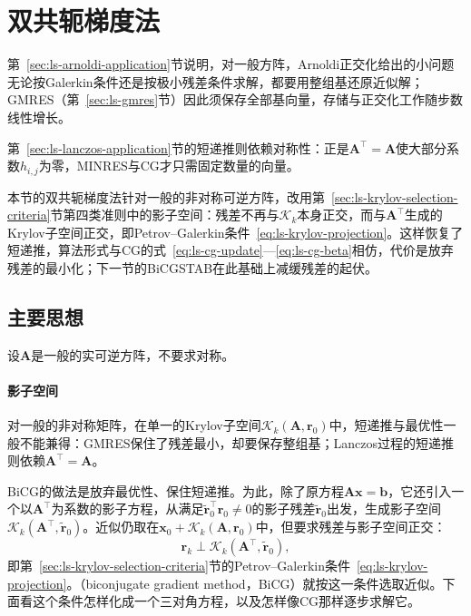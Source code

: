 \section{双共轭梯度法}
\label{sec:ls-bicg}

第~\ref{sec:ls-arnoldi-application}节说明，对一般方阵，Arnoldi正交化给出的小问题无论按Galerkin条件还是按极小残差条件求解，都要用整组基还原近似解；GMRES（第~\ref{sec:ls-gmres}节）因此须保存全部基向量，存储与正交化工作随步数线性增长。

第~\ref{sec:ls-lanczos-application}节的短递推则依赖对称性：正是$\bm A^\top=\bm A$使大部分系数$h_{i,j}$为零，MINRES与CG才只需固定数量的向量。

本节的双共轭梯度法针对一般的非对称可逆方阵，改用第~\ref{sec:ls-krylov-selection-criteria}节第四类准则中的影子空间：残差不再与$\mathcal K_k$本身正交，而与$\bm A^\top$生成的Krylov子空间正交，即Petrov--Galerkin条件~\eqref{eq:ls-krylov-projection}。这样恢复了短递推，算法形式与CG的式~\eqref{eq:ls-cg-update}—\eqref{eq:ls-cg-beta}相仿，代价是放弃残差的最小化；下一节的BiCGSTAB在此基础上减缓残差的起伏。

\subsection{主要思想}

设$\bm A$是一般的实可逆方阵，不要求对称。

\paragraph{影子空间}
对一般的非对称矩阵，在单一的Krylov子空间$\mathcal K_k(\bm A,\bm r_0)$中，短递推与最优性一般不能兼得：GMRES保住了残差最小，却要保存整组基；Lanczos过程的短递推则依赖$\bm A^\top=\bm A$。

BiCG的做法是放弃最优性、保住短递推。为此，除了原方程$\bm A\bm x=\bm b$，它还引入一个以$\bm A^\top$为系数的影子方程，从满足$\widetilde{\bm r}_0^\top\bm r_0\ne0$的影子残差$\widetilde{\bm r}_0$出发，生成影子空间$\mathcal K_k(\bm A^\top,\widetilde{\bm r}_0)$。近似仍取在$\bm x_0+\mathcal K_k(\bm A,\bm r_0)$中，但要求残差与影子空间正交：
\[
 \bm r_k\perp\mathcal K_k(\bm A^\top,\widetilde{\bm r}_0),
\]
即第~\ref{sec:ls-krylov-selection-criteria}节的Petrov--Galerkin条件~\eqref{eq:ls-krylov-projection}。（biconjugate gradient method，BiCG）就按这一条件选取近似。下面看这个条件怎样化成一个三对角方程，以及怎样像CG那样逐步求解它。


